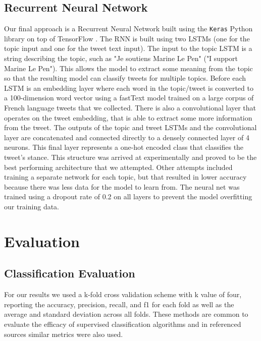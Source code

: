 \documentclass[journal]{IEEEtran}
\newcommand{\code}[1]{\texttt{#1}}
\begin{document}
\subsection{Recurrent Neural Network}
Our final approach is a Recurrent Neural Network built using the \code{Keras} \cite{chollet2015} Python library on top of TensorFlow \cite{tensorflow2015-whitepaper}. The RNN is built using two LSTMs (one for the topic input and one for the tweet text input). The input to the topic LSTM is a string describing the topic, such as "Je soutiens Marine Le Pen" ("I support Marine Le Pen"). This allows the model to extract some meaning from the topic so that the resulting model can classify tweets for multiple topics. Before each LSTM is an embedding layer where each word in the topic/tweet is converted to a 100-dimension word vector using a fastText \cite{bojanowski2016enriching} model trained on a large corpus of French language tweets that we collected. There is also a convolutional layer that operates on the tweet embedding, that is able to extract some more information from the tweet. The outputs of the topic and tweet LSTMs and the convolutional layer are concatenated and connected directly to a densely connected layer of 4 neurons. This final layer represents a one-hot encoded class that classifies the tweet's stance. This structure was arrived at experimentally and proved to be the best performing architecture that we attempted. Other attempts included training a separate network for each topic, but that resulted in lower accuracy because there was less data for the model to learn from. The neural net was trained using a dropout rate of 0.2 on all layers to prevent the model overfitting our training data.


\clearpage


\section{Evaluation}

\subsection{Classification Evaluation}
For our results we used a k-fold cross validation scheme with k value of four, reporting the accuracy, precision, recall, and f1 for each fold as well as the average and standard deviation across all folds. These methods are common to evaluate the efficacy of supervised classification algorithms and in referenced sources similar metrics were also used. 
\end{document}
